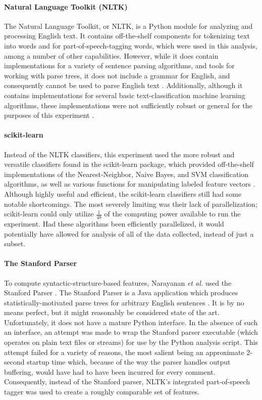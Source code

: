 \documentclass[12pt]{article}
\begin{document}
\paragraph{Natural Language Toolkit (NLTK)}
The Natural Language Toolkit, or NLTK, is a Python module for analyzing and processing English text. It contains off-the-shelf components for tokenizing text into words and for part-of-speech-tagging words, which were used in this analysis, among a number of other capabilities. However, while it does contain implementations for a variety of sentence parsing algorithms, and tools for working with parse trees, it does not include a grammar for English, and consequently cannot be used to parse English text \cite{bird2006nltk}. Additionally, although it contains implementations for several basic text-classification machine learning algorithms, these implementations were not sufficiently robust or general for the purposes of this experiment \cite{nltk2012classify}.

\paragraph{scikit-learn}
Instead of the NLTK classifiers, this experiment used the more robust and versatile classifiers found in the scikit-learn package, which provided off-the-shelf implementations of the Nearest-Neighbor, Naive Bayes, and SVM classification algorithms, as well as various functions for manipulating labeled feature vectors \cite{pedregosa2011scikit}. Although highly useful and efficient, the scikit-learn classifiers still had some notable shortcomings. The most severely limiting was their lack of parallelization; scikit-learn could only utilize $\frac{1}{48}$ of the computing power available to run the experiment. Had these algorithms been efficiently parallelized, it would potentially have allowed for analysis of all of the data collected, instead of just a subset.

\paragraph{The Stanford Parser}
To compute syntactic-structure-based features, Narayanan \textit{et al.} used the Stanford Parser \cite{narayanan2012feasibility, klein2003accurate}. The Stanford Parser is a Java application which produces statistically-motivated parse trees for arbitrary English sentences \cite{klein2003accurate}. It is by no means perfect, but it might reasonably be considered state of the art. Unfortunately, it does not have a mature Python interface. In the absence of such an interface, an attempt was made to wrap the Stanford parser executable (which operates on plain text files or streams) for use by the Python analysis script. This attempt failed for a variety of reasons, the most salient being an approximate 2-second startup time which, because of the way the parser handles output buffering, would have had to have been incurred for every comment. Consequently, instead of the Stanford parser, NLTK's integrated part-of-speech tagger was used to create a roughly comparable set of features.
\end{document}
